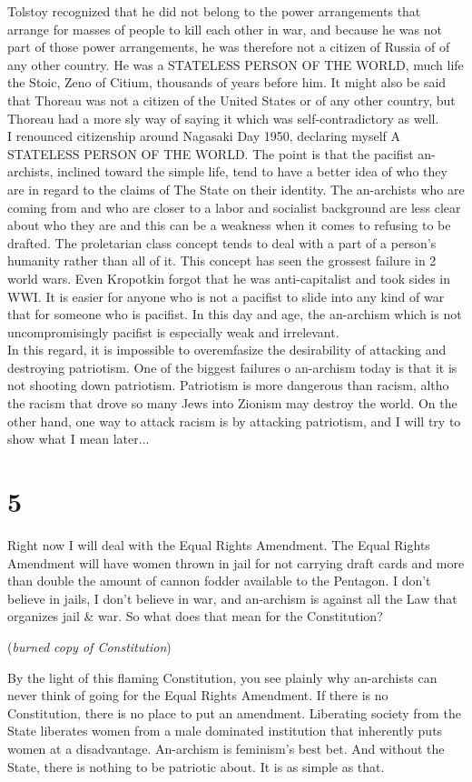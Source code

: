 \documentclass[12pt, onecolumn, letterpaper, oneside]{book}
\begin{document}
Tolstoy recognized that he did not belong to the power arrangements that arrange for masses of people to kill each other in war, and because he was not part of those power arrangements, he was therefore not a citizen of Russia of of any other country. He was a STATELESS PERSON OF THE WORLD, much life the Stoic, Zeno of Citium, thousands of years before him. It might also be said that Thoreau was not a citizen of the United States or of any other country, but Thoreau had a more sly way of saying it which was self-contradictory as well.\\
I renounced citizenship around Nagasaki Day 1950, declaring myself A STATELESS PERSON OF THE WORLD. The point is that the pacifist an-archists, inclined toward the simple life, tend to have a better idea of who they are in regard to the claims of The State on their identity. The an-archists who are coming from and who are closer to a labor and socialist background are less clear about who they are and this can be a weakness when it comes to refusing to be drafted. The proletarian class concept tends to deal with a part of a person's humanity rather than all of it. This concept has seen the grossest failure in 2 world wars. Even Kropotkin forgot that he was anti-capitalist and took sides in WWI. It is easier for anyone who is not a pacifist to slide into any kind of war that for someone who is pacifist. In this day and age, the an-archism which is not uncompromisingly pacifist is especially weak and irrelevant.\\
In this regard, it is impossible to overemfasize the desirability of attacking and destroying patriotism. One of the biggest failures o an-archism today is that it is not shooting down patriotism. Patriotism is more dangerous than racism, altho the racism that drove so many Jews into Zionism may destroy the world. On the other hand, one way to attack racism is by attacking patriotism, and I will try to show what I mean later...

\section*{5}
Right now I will deal with the Equal Rights Amendment. The Equal Rights Amendment will have women thrown in jail for not carrying draft cards and more than double the amount of cannon fodder available to the Pentagon. I don't believe in jails, I don't believe in war, and an-archism is against all the Law that organizes jail \& war. So what does that mean for the Constitution?
\begin{center}
(\emph{burned copy of Constitution})
\end{center}
By the light of this flaming Constitution, you see plainly why an-archists can never think of going for the Equal Rights Amendment. If there is no Constitution, there is no place to put an amendment. Liberating society from the State liberates women from a male dominated institution that inherently puts women at a disadvantage. An-archism is feminism's best bet. And without the State, there is nothing to be patriotic about. It is as simple as that.
\end{document}
